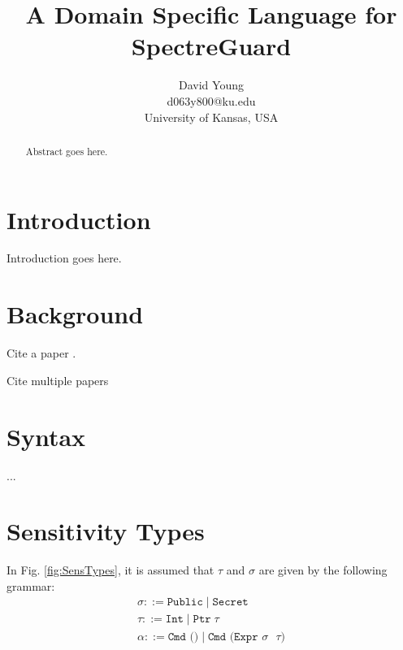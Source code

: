 \documentclass[10pt, conference]{IEEEtran}
\newcommand{\ttt}{\texttt}
\begin{document}
\title{A Domain Specific Language for SpectreGuard}
\author{David Young\\
d063y800@ku.edu\\
University of Kansas, USA\\
}

\maketitle
\thispagestyle{empty}
\begin{abstract}

Abstract goes here.

\end{abstract}


\section{Introduction}
Introduction goes here.

\section{Background}
Cite a paper \cite{barroso2009datacenter}.

Cite multiple papers \cite{banga99resourcecontainers,barroso2009datacenter}

\section{Syntax}
...

\section{Sensitivity Types}
In Fig. \ref{fig:SensTypes}, it is assumed that $\tau$ and $\sigma$ are given by the
following grammar:
\begin{gather*}
  \sigma ::= \ttt{Public}\;|\;\ttt{Secret}\\
  \tau ::= \ttt{Int}\;|\;\ttt{Ptr}\;\tau\\
  \alpha ::= \ttt{Cmd ()}\;|\;\ttt{Cmd (Expr $\sigma$ $\tau$)}
\end{gather*}
\end{document}
